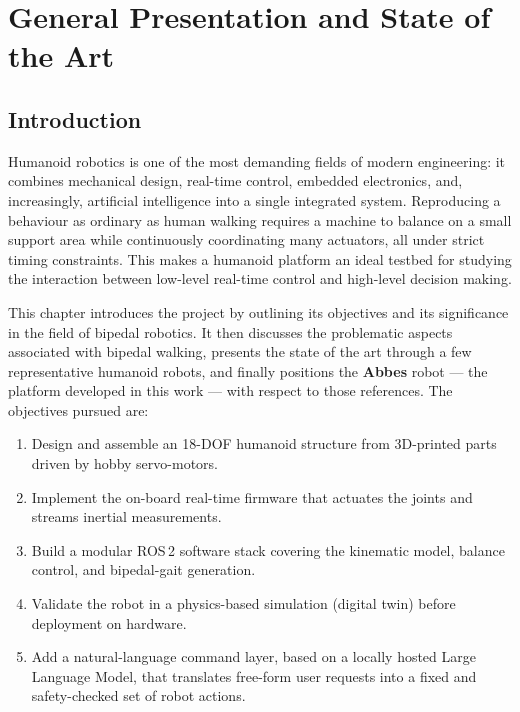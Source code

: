 \chapter{General Presentation and State of the Art}
\label{chap:presentation}

\section{Introduction}

Humanoid robotics is one of the most demanding fields of modern
engineering: it combines mechanical design, real-time control, embedded
electronics, and, increasingly, artificial intelligence into a single
integrated system. Reproducing a behaviour as ordinary as human walking
requires a machine to balance on a small support area while continuously
coordinating many actuators, all under strict timing constraints. This
makes a humanoid platform an ideal testbed for studying the interaction
between low-level real-time control and high-level decision making.

This chapter introduces the project by outlining its objectives and its
significance in the field of bipedal robotics. It then discusses the
problematic aspects associated with bipedal walking, presents the state
of the art through a few representative humanoid robots, and finally
positions the \textbf{Abbes} robot --- the platform developed in this
work --- with respect to those references. The objectives pursued are:

\begin{enumerate}[itemsep=2pt,topsep=4pt]
  \item Design and assemble an 18-DOF humanoid structure from 3D-printed
        parts driven by hobby servo-motors.
  \item Implement the on-board real-time firmware that actuates the
        joints and streams inertial measurements.
  \item Build a modular ROS\,2 software stack covering the kinematic
        model, balance control, and bipedal-gait generation.
  \item Validate the robot in a physics-based simulation (digital twin)
        before deployment on hardware.
  \item Add a natural-language command layer, based on a locally hosted
        Large Language Model, that translates free-form user requests
        into a fixed and safety-checked set of robot actions.
\end{enumerate}

